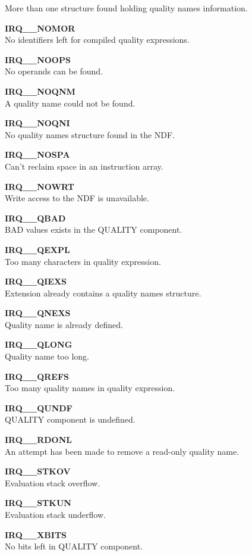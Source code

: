 \begin{description}
More than one structure found holding quality names information.
\item {\bf IRQ\_\_NOMOR}\\
No identifiers left for compiled quality expressions.
\item {\bf IRQ\_\_NOOPS}\\
No operands can be found.
\item {\bf IRQ\_\_NOQNM}\\
A quality name could not be found.
\item {\bf IRQ\_\_NOQNI}\\
No quality names structure found in the NDF.
\item {\bf IRQ\_\_NOSPA}\\
Can't reclaim space in an instruction array.
\item {\bf IRQ\_\_NOWRT}\\
Write access to the NDF is unavailable.
\item {\bf IRQ\_\_QBAD }\\
BAD values exists in the QUALITY component.
\item {\bf IRQ\_\_QEXPL}\\
Too many characters in quality expression.
\item {\bf IRQ\_\_QIEXS}\\
Extension already contains a quality names structure.
\item {\bf IRQ\_\_QNEXS}\\
Quality name is already defined.
\item {\bf IRQ\_\_QLONG}\\
Quality name too long.
\item {\bf IRQ\_\_QREFS}\\
Too many quality names in quality expression.
\item {\bf IRQ\_\_QUNDF}\\
QUALITY component is undefined.
\item {\bf IRQ\_\_RDONL}\\
An attempt has been made to remove a read-only quality name.
\item {\bf IRQ\_\_STKOV}\\
Evaluation stack overflow.
\item {\bf IRQ\_\_STKUN}\\
Evaluation stack underflow.
\item {\bf IRQ\_\_XBITS}\\
No bits left in QUALITY component.
\end{description}


